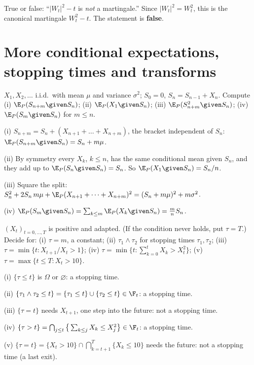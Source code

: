 \begin{problem}
True or false: ``$|W_t|^2-t$ is \emph{not} a martingale.'' Since $|W_t|^2=W_t^2$, this is the canonical martingale $W_t^2-t$. The statement is \textbf{false}.
\end{problem}

\section{More conditional expectations, stopping times and transforms}

\begin{problem}
$X_1,X_2,\ldots$ i.i.d.\ with mean $\mu$ and variance $\sigma^2$; $S_0=0$, $S_n=S_{n-1}+X_n$. Compute (i) $\E_P(S_{n+m}\given S_n)$; (ii) $\E_P(X_1\given S_n)$; (iii) $\E_P(S_{n+m}^2\given S_n)$; (iv) $\E_P(S_m\given S_n)$ for $m\le n$.
\begin{steps}
  \item (i) $S_{n+m}=S_n+(X_{n+1}+\dots+X_{n+m})$, the bracket independent of $S_n$: $\E_P(S_{n+m}\given S_n)=S_n+m\mu$.
  \item (ii) By symmetry every $X_k$, $k\le n$, has the same conditional mean given $S_n$, and they add up to $\E_P(S_n\given S_n)=S_n$. So $\E_P(X_1\given S_n)=S_n/n$.
  \item (iii) Square the split: $S_n^2+2S_n\,m\mu+\E_P(X_{n+1}+\dots+X_{n+m})^2=(S_n+m\mu)^2+m\sigma^2$.
  \item (iv) $\E_P(S_m\given S_n)=\sum_{k\le m}\E_P(X_k\given S_n)=\frac mnS_n$.
\end{steps}
\end{problem}

\begin{problem}
$(X_t)_{t=0,\dots,T}$ is positive and adapted. (If the condition never holds, put $\tau=T$.) Decide for: (i) $\tau=m$, a constant; (ii) $\tau_1\wedge\tau_2$ for stopping times $\tau_1,\tau_2$; (iii) $\tau=\min\{t:X_{t+1}/X_t>1\}$; (iv) $\tau=\min\{t:\sum_{k=0}^tX_k>X_t^2\}$; (v) $\tau=\max\{t\le T:X_t>10\}$.
\begin{steps}
  \item (i) $\{\tau\le t\}$ is $\Omega$ or $\varnothing$: a stopping time.
  \item (ii) $\{\tau_1\wedge\tau_2\le t\}=\{\tau_1\le t\}\cup\{\tau_2\le t\}\in\F_t$: a stopping time.
  \item (iii) $\{\tau=t\}$ needs $X_{t+1}$, one step into the future: not a stopping time.
  \item (iv) $\{\tau>t\}=\bigcap_{j\le t}\big\{\sum_{k\le j}X_k\le X_j^2\big\}\in\F_t$: a stopping time.
  \item (v) $\{\tau=t\}=\{X_t>10\}\cap\bigcap_{k=t+1}^T\{X_k\le10\}$ needs the future: not a stopping time (a last exit).
\end{steps}
\end{problem}

